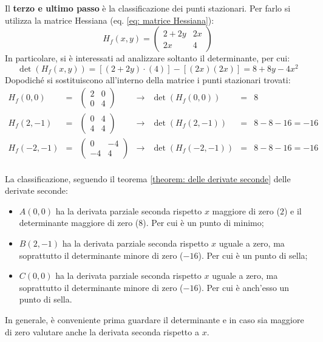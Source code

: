 \documentclass[a4paper]{article}
\begin{document}
	\noindent
	Il \textbf{terzo e ultimo passo} è la classificazione dei punti stazionari. Per farlo si utilizza la matrice Hessiana (eq. \ref{eq: matrice Hessiana}):
	\begin{equation*}
		H_{f}\left(x,y\right) = 
		\begin{pmatrix}
			2+2y 	& 2x \\
			2x		& 4
		\end{pmatrix}
	\end{equation*}
	In particolare, si è interessati ad analizzare soltanto il determinante, per cui:
	\begin{equation*}
		\det\left(H_{f}\left(x,y\right)\right) = \left[\left(2+2y\right)\cdot \left(4\right)\right] - \left[\left(2x\right)\left(2x\right)\right] = 8+8y-4x^{2}
	\end{equation*}
	Dopodiché si sostituiscono all'interno della matrice i punti stazionari trovati:
	\begin{equation*}
		\begin{array}{rclclcl}
			H_{f}\left(0,0\right) 
			&=& 
			\begin{pmatrix}
				2 & 0 \\ 0 & 4
			\end{pmatrix}
			&\rightarrow&
			\det\left(H_{f}\left(0,0\right)\right) &=& 8 \\ [1em]
			H_{f}\left(2,-1\right) 
			&=& 
			\begin{pmatrix}
				0 & 4 \\ 4 & 4
			\end{pmatrix}
			&\rightarrow&
			\det\left(H_{f}\left(2,-1\right)\right) &=& 8 - 8 - 16 = -16 \\ [1em]
			H_{f}\left(-2,-1\right) 
			&=& 
			\begin{pmatrix}
				0 & -4 \\ -4 & 4
			\end{pmatrix}
			&\rightarrow&
			\det\left(H_{f}\left(-2,-1\right)\right) &=& 8 - 8 - 16 = -16 \\ [1em]
		\end{array}
	\end{equation*}\newpage

	\noindent
	La classificazione, seguendo il teorema \ref{theorem: delle derivate seconde} delle derivate seconde:
	\begin{itemize}
		\item $A\left(0,0\right)$ ha la derivata parziale seconda rispetto $x$ maggiore di zero ($2$) e il determinante maggiore di zero ($8$). Per cui è un punto di minimo;

		\item $B\left(2,-1\right)$ ha la derivata parziale seconda rispetto $x$ uguale a zero, ma soprattutto il determinante minore di zero ($-16$). Per cui è un punto di sella;

		\item $C\left(0,0\right)$ ha la derivata parziale seconda rispetto $x$ uguale a zero, ma soprattutto il determinante minore di zero ($-16$). Per cui è anch'esso un punto di sella.
	\end{itemize}
	In generale, è conveniente prima guardare il determinante e in caso sia maggiore di zero valutare anche la derivata seconda rispetto a $x$.\newpage
	
\end{document}
